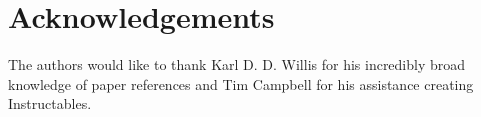 \section{Acknowledgements}
The authors would like to thank Karl D. D. Willis for his incredibly broad knowledge of paper references and Tim Campbell for his assistance creating Instructables.